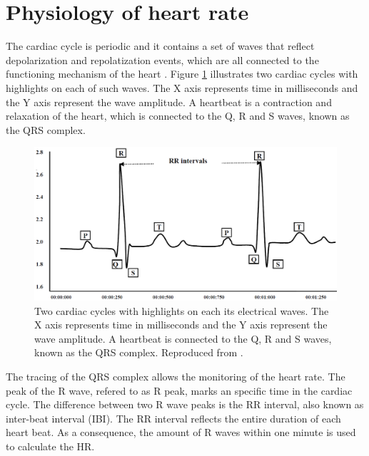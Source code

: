
\section{Physiology of heart rate}

The cardiac cycle is periodic and it contains a set of waves that reflect depolarization and repolatization events, which are all connected to the functioning mechanism of the heart \parencite{yanowitz2012introduction}. Figure \ref{fig:rr-interval} illustrates two cardiac cycles with highlights on each of such waves. The X axis represents time in milliseconds and the Y axis represent the wave amplitude. A heartbeat is a contraction and relaxation of the heart, which is connected to the Q, R and S waves, known as the QRS complex.

\begin{figure}[h!]
    \centering
    \includegraphics[width=0.8\linewidth]{figures/rr-interval.png}
    \caption{Two cardiac cycles with highlights on each its electrical waves. The X axis represents time in milliseconds and the Y axis represent the wave amplitude. A heartbeat is connected to the Q, R and S waves, known as the QRS complex. Reproduced from \parencite{ahmed2010heart}.}
    \label{fig:rr-interval}
\end{figure}

The tracing of the QRS complex allows the monitoring of the heart rate. The peak of the R wave, refered to as R peak, marks an specific time in the cardiac cycle. The difference between two R wave peaks is the RR interval, also known as inter-beat interval (IBI). The RR interval reflects the entire duration of each heart beat. As a consequence, the amount of R waves within one minute is used to calculate the HR.

